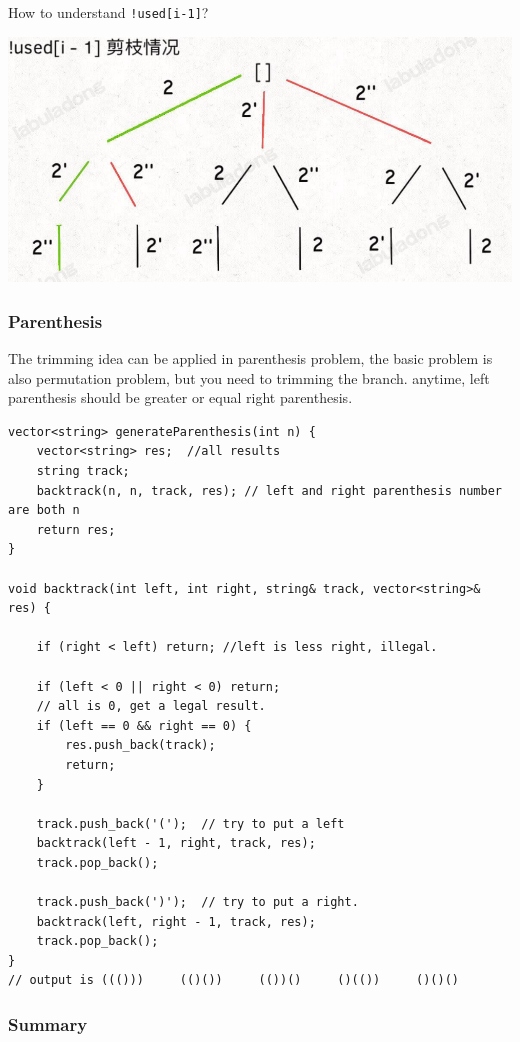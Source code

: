 \documentclass[a4paper,11pt,twoside]{book}
\begin{document}
	\par How to understand \verb|!used[i-1]|? 
	\begin{center}
		\includegraphics[width=0.5\linewidth]{pics/per_duplicate}
	\end{center}
	


\subsubsection{Parenthesis}

	\par The trimming idea can be applied in parenthesis problem, the basic problem is also permutation problem, but you need to trimming the branch. 
	anytime, left parenthesis should be greater or equal right parenthesis. 
	
\begin{lstlisting}
vector<string> generateParenthesis(int n) {
	vector<string> res;  //all results
	string track;
	backtrack(n, n, track, res); // left and right parenthesis number are both n
	return res;
}

void backtrack(int left, int right, string& track, vector<string>& res) {
	
	if (right < left) return; //left is less right, illegal.
	
	if (left < 0 || right < 0) return;
	// all is 0, get a legal result.
	if (left == 0 && right == 0) {
		res.push_back(track);
		return;
	}
	
	track.push_back('(');  // try to put a left 
	backtrack(left - 1, right, track, res);
	track.pop_back(); 
	
	track.push_back(')');  // try to put a right.
	backtrack(left, right - 1, track, res);
	track.pop_back(); 
}
// output is ((()))     (()())     (())()     ()(())     ()()()
\end{lstlisting}

\subsubsection{Summary}
	
\end{document}
